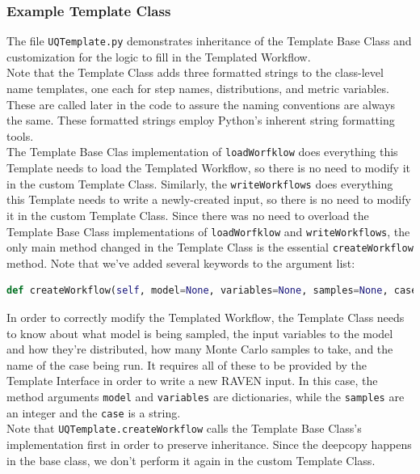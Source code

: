 \subsubsection{Example Template Class}
The file \texttt{UQTemplate.py} demonstrates inheritance of the Template Base Class and customization for the logic to fill in the Templated Workflow.
\\

Note that the Template Class adds three formatted strings to the class-level name templates, one each for step names, distributions, and metric variables. These are called later in the code to assure the naming conventions are always the same. These formatted strings employ Python's inherent string formatting tools.
\\

The Template Base Clas implementation of \texttt{loadWorfklow} does everything this Template needs to load the Templated Workflow, so there is no need to modify it in the custom Template Class. Similarly, the \texttt{writeWorkflows} does everything this Template needs to write a newly-created input, so there is no need to modify it in the custom Template Class.  Since there was no need to overload the Template Base Class implementations of \texttt{loadWorfklow} and \texttt{writeWorkflows}, the only main method changed in the Template Class is the essential \texttt{createWorkflow} method. Note that we've added several keywords to the argument list:
\begin{lstlisting}[language=python]
  def createWorkflow(self, model=None, variables=None, samples=None, case=None, **kwargs):
\end{lstlisting}
In order to correctly modify the Templated Workflow, the Template Class needs to know about what model is being sampled, the input variables to the model and how they're distributed, how many Monte Carlo samples to take, and the name of the case being run. It requires all of these to be provided by the Template Interface in order to write a new RAVEN input. In this case, the method arguments \texttt{model} and \texttt{variables} are dictionaries, while the \texttt{samples} are an integer and the \texttt{case} is a string.
\\

Note that \texttt{UQTemplate.createWorkflow} calls the Template Base Class's implementation first in order to preserve inheritance. Since the deepcopy happens in the base class, we don't perform it again in the custom Template Class.
\\

